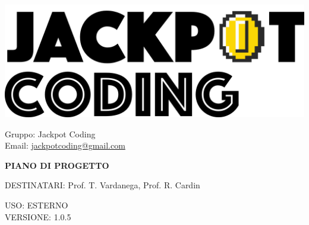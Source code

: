 \documentclass[5pt]{article}
\begin{document}
\begin{minipage}[t]{0.50\textwidth}
    \begin{flushleft}
        \hspace{10pt}
        \includegraphics[scale=0.65]{jackpot-logo.png} 
    \end{flushleft}
\end{minipage}
\hspace{-60pt} %
\begin{flushright}
    \begin{minipage}[t]{0.50\textwidth}
        \begin{flushright}
            Gruppo: {\Large Jackpot Coding}\\
            Email: \href{mailto:jackpotcoding@gmail.com}{jackpotcoding@gmail.com}
        \end{flushright}
    \end{minipage}
\end{flushright}

\vspace{24pt}

\begin{center}
    \textbf{\LARGE PIANO DI PROGETTO}
\end{center}

\vspace{13pt}

\begin{flushleft}
    \begin{spacing}{1.5}
        DESTINATARI: Prof. T. Vardanega, Prof. R. Cardin\\%
    \end{spacing}
\end{flushleft}

\begin{flushright}
    \begin{spacing}{1}
        USO: ESTERNO\\
        VERSIONE: 1.0.5\\
    \end{spacing}
\end{flushright}
\end{document}
